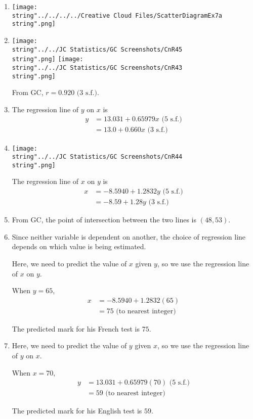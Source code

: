 \documentclass[11pt,a4paper]{book}
\begin{document}
\begin{example}
\begin{enumerate}[label=(\alph*)]

\item  \texttt{[image: \\string"../../../../Creative Cloud Files/ScatterDiagramEx7a\\string".png]}

\item  \texttt{[image: \\string"../../JC Statistics/GC Screenshots/CnR45\\string".png]}
\hspace{1cm}\texttt{[image: \\string"../../JC Statistics/GC Screenshots/CnR43\\string".png]}

From GC, $r=0.920\text{ (3 s.f.)}$.

\item  The regression line of $y$ on $x$ is
\begin{align*}
y & =13.031+0.65979x\text{ (5 s.f.)}\\
 & =13.0+0.660x\text{ (3 s.f.)}
\end{align*}

\item  \texttt{[image: \\string"../../JC Statistics/GC Screenshots/CnR44\\string".png]}

The regression line of $x$ on $y$ is
\begin{align*}
x & =-8.5940+1.2832y\text{ (5 s.f.)}\\
 & =-8.59+1.28y\text{ (3 s.f.)}
\end{align*}

\item  From GC, the point of intersection between the two lines is
$\left(48,53\right)$.

\item Since neither variable is dependent on another, the choice
of regression line depends on which value is being estimated.

Here, we need to predict the value of $x$ given $y$, so we use the
regression line of $x$ on $y$.

When $y=65$,
\begin{align*}
x & =-8.5940+1.2832\left(65\right)\\
 & =75\text{ (to nearest integer)}
\end{align*}

The predicted mark for his French test is $75$.

\item  Here, we need to predict the value of $y$ given $x$, so
we use the regression line of $y$ on $x$.

When $x=70$,
\begin{align*}
y & =13.031+0.65979\left(70\right)\text{ (5 s.f.)}\\
 & =59\text{ (to nearest integer)}
\end{align*}

The predicted mark for his English test is $59$.

\end{enumerate}

\end{example}
\end{document}
